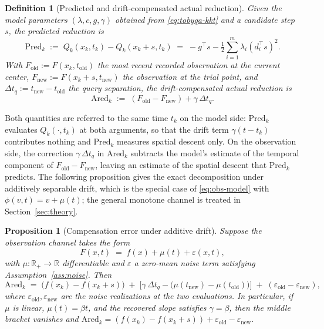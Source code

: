 \documentclass[11pt,a4paper]{article}
\newcommand{\R}{\mathbb{R}}
\newtheorem{proposition}[theorem]{Proposition}
\newtheorem{definition}[theorem]{Definition}
\begin{document}
\begin{definition}[Predicted and drift-compensated actual reduction]
\label{def:pred-ared}
Given the model parameters $(\lambda, c, g, \gamma)$ obtained from
\eqref{eq:tobyqa-kkt} and a candidate step $s$, the
\emph{predicted reduction} is
\begin{equation}\label{eq:pred}
  \mathrm{Pred}_k
  \;:=\; Q_k(x_k, t_k) - Q_k(x_k + s, t_k)
  \;=\; -g^{\!\top} s
        - \tfrac{1}{2}\sum_{i=1}^m \lambda_i (d_i^{\!\top} s)^2.
\end{equation}
With $F_{\mathrm{old}} := F(x_k, t_{\mathrm{old}})$ the most recent
recorded observation at the current center,
$F_{\mathrm{new}} := F(x_k + s, t_{\mathrm{new}})$ the observation
at the trial point, and $\Delta t_q := t_{\mathrm{new}} -
t_{\mathrm{old}}$ the query separation, the
\emph{drift-compensated actual reduction} is
\begin{equation}\label{eq:ared}
  \mathrm{Ared}_k
  \;:=\; (F_{\mathrm{old}} - F_{\mathrm{new}})
       + \gamma\,\Delta t_q.
\end{equation}
\end{definition}

Both quantities are referred to the same time $t_k$ on the model
side: $\mathrm{Pred}_k$ evaluates $Q_k(\cdot, t_k)$ at both
arguments, so that the drift term $\gamma(t - t_k)$ contributes
nothing and $\mathrm{Pred}_k$ measures spatial descent only. On the
observation side, the correction $\gamma\,\Delta t_q$ in
$\mathrm{Ared}_k$ subtracts the model's estimate of the temporal
component of $F_{\mathrm{old}} - F_{\mathrm{new}}$, leaving an
estimate of the spatial descent that $\mathrm{Pred}_k$ predicts.
The following proposition gives the exact decomposition under
additively separable drift, which is the special case of
\eqref{eq:obs-model} with $\phi(v, t) = v + \mu(t)$; the general
monotone channel is treated in Section~\ref{sec:theory}.

\begin{proposition}[Compensation error under additive drift]
\label{prop:ared-error}
Suppose the observation channel takes the form
\begin{equation}\label{eq:additive-drift}
  F(x, t) \;=\; f(x) + \mu(t) + \varepsilon(x, t),
\end{equation}
with $\mu:\R_+\to\R$ differentiable and $\varepsilon$ a zero-mean
noise term satisfying Assumption~\ref{ass:noise}. Then
\begin{equation}\label{eq:ared-decomp}
  \mathrm{Ared}_k
  \;=\;
  \bigl(f(x_k) - f(x_k + s)\bigr)
  \;+\;
  \bigl[\gamma\,\Delta t_q
        - \bigl(\mu(t_{\mathrm{new}}) -
                \mu(t_{\mathrm{old}})\bigr)\bigr]
  \;+\;
  (\varepsilon_{\mathrm{old}} - \varepsilon_{\mathrm{new}}),
\end{equation}
where $\varepsilon_{\mathrm{old}}, \varepsilon_{\mathrm{new}}$ are
the noise realizations at the two evaluations. In particular, if
$\mu$ is linear, $\mu(t) = \beta t$, and the recovered slope
satisfies $\gamma = \beta$, then the middle bracket vanishes and
$\mathrm{Ared}_k = (f(x_k) - f(x_k + s)) +
\varepsilon_{\mathrm{old}} - \varepsilon_{\mathrm{new}}$.
\end{proposition}
\end{document}
